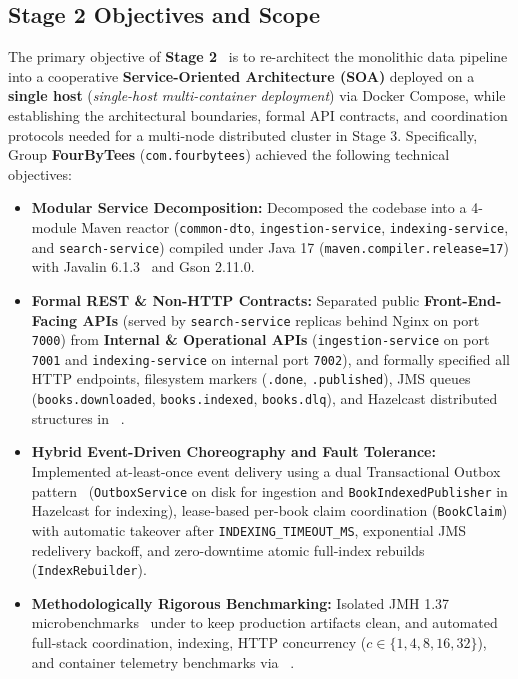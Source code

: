 \documentclass[10pt,a4paper]{article}
\begin{document}
\subsection{Stage 2 Objectives and Scope}
The primary objective of \textbf{Stage 2}~\cite{ulpgc_stage2_spec} is to re-architect the monolithic data pipeline into a cooperative \textbf{Service-Oriented Architecture (SOA)} deployed on a \textbf{single host} (\emph{single-host multi-container deployment}) via Docker Compose, while establishing the architectural boundaries, formal API contracts, and coordination protocols needed for a multi-node distributed cluster in Stage 3. Specifically, Group \textbf{FourByTees} (\texttt{com.fourbytees}) achieved the following technical objectives:
\begin{itemize}[leftmargin=*,nosep]
    \item \textbf{Modular Service Decomposition:} Decomposed the codebase into a 4-module Maven reactor (\texttt{common-dto}, \texttt{ingestion-service}, \texttt{indexing-service}, and \texttt{search-service}) compiled under Java 17 (\texttt{maven.compiler.release=17}) with Javalin 6.1.3~\cite{javalin_docs} and Gson 2.11.0.
    \item \textbf{Formal REST \& Non-HTTP Contracts:} Separated public \textbf{Front-End-Facing APIs} (served by \texttt{search-service} replicas behind Nginx on port \texttt{7000}) from \textbf{Internal \& Operational APIs} (\texttt{ingestion-service} on port \texttt{7001} and \texttt{indexing-service} on internal port \texttt{7002}), and formally specified all HTTP endpoints, filesystem markers (\texttt{.done}, \texttt{.published}), JMS queues (\texttt{books.downloaded}, \texttt{books.indexed}, \texttt{books.dlq}), and Hazelcast distributed structures in ~\cite{openapi_spec}.
    \item \textbf{Hybrid Event-Driven Choreography and Fault Tolerance:} Implemented at-least-once event delivery using a dual Transactional Outbox pattern~\cite{microservices_richardson} (\texttt{OutboxService} on disk for ingestion and \texttt{BookIndexedPublisher} in Hazelcast for indexing), lease-based per-book claim coordination (\texttt{BookClaim}) with automatic takeover after \texttt{INDEXING\_TIMEOUT\_MS}, exponential JMS redelivery backoff, and zero-downtime atomic full-index rebuilds (\texttt{IndexRebuilder}).
    \item \textbf{Methodologically Rigorous Benchmarking:} Isolated JMH 1.37 microbenchmarks~\cite{jmh_docs} under  to keep production artifacts clean, and automated full-stack coordination, indexing, HTTP concurrency ($c \in \{1, 4, 8, 16, 32\}$), and container telemetry benchmarks via ~\cite{fourbytees_benchmarks}.
\end{itemize}
\end{document}
